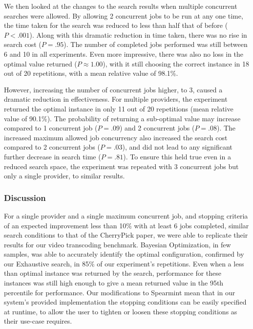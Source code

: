 \documentclass{report}
\begin{document}
We then looked at the changes to the search results when multiple concurrent searches were allowed. By allowing 2 concurrent jobs to be run at any one time, the time taken for the search was reduced to less than half that of before ($P < .001$). Along with this  dramatic reduction in time taken, there was no rise in search cost ($P = .95$). The number of completed jobs performed was still between 6 and 10 in all experiments. Even more impressive, there was also no loss in the optimal value returned ($P \approx 1.00 $), with it still choosing the correct instance in 18 out of 20 repetitions, with a mean relative value of 98.1\%.

However, increasing the number of concurrent jobs higher, to 3, caused a dramatic reduction in effectiveness. For multiple providers, the experiment returned the optimal instance in only 11 out of 20 repetitions (mean relative value of 90.1\%). The probability of returning a sub-optimal value may increase compared to 1 concurrent job ($ P = .09$) and 2 concurrent jobs ($P = .08$). The increased maximum allowed job concurrency also increased the search cost compared to 2 concurrent jobs ($P = .03$), and did not lead to any significant further decrease in search time ($P = .81$). To ensure this held true even in a reduced search space, the experiment was repeated with 3 concurrent jobs but only a single provider, to similar results.

\subsubsection{Discussion}
For a single provider and a single maximum concurrent job, and stopping criteria of an expected improvement less than 10\% with at least 6 jobs completed, similar search conditions to that of the CherryPick paper\cite{Alipourfard2017}, we were able to replicate their results for our video transcoding benchmark. Bayesian Optimization, in few samples, was able to accurately identify the optimal configuration, confirmed by our Exhaustive search, in 85\% of our experiment's repetitions. Even when a less than optimal instance was returned by the search, performance for these instances was still high enough to give a mean returned value in the 95th percentile for performance. Our modifications to Spearmint mean that in our system's provided implementation the stopping conditions can be easily specified at runtime, to allow the user to tighten or loosen these stopping conditions as their use-case requires.
\end{document}
